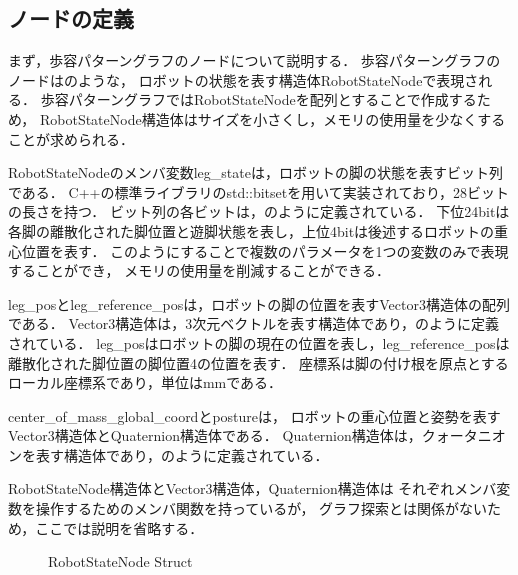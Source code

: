 \subsection{ノードの定義}
まず，歩容パターングラフのノードについて説明する．
歩容パターングラフのノードはのような，
ロボットの状態を表す構造体RobotStateNodeで表現される．
歩容パターングラフではRobotStateNodeを配列とすることで作成するため，
RobotStateNode構造体はサイズを小さくし，メモリの使用量を少なくすることが求められる．

RobotStateNodeのメンバ変数leg\_stateは，ロボットの脚の状態を表すビット列である．
C++の標準ライブラリのstd::bitsetを用いて実装されており，28ビットの長さを持つ．
ビット列の各ビットは，のように定義されている．
下位24bitは各脚の離散化された脚位置と遊脚状態を表し，上位4bitは後述するロボットの重心位置を表す．
このようにすることで複数のパラメータを1つの変数のみで表現することができ，
メモリの使用量を削減することができる．

leg\_posとleg\_reference\_posは，ロボットの脚の位置を表すVector3構造体の配列である．
Vector3構造体は，3次元ベクトルを表す構造体であり，のように定義されている．
leg\_posはロボットの脚の現在の位置を表し，leg\_reference\_posは離散化された脚位置の脚位置4の位置を表す．
座標系は脚の付け根を原点とするローカル座標系であり，単位はmmである．

center\_of\_mass\_global\_coordとpostureは，
ロボットの重心位置と姿勢を表すVector3構造体とQuaternion構造体である．
Quaternion構造体は，クォータニオンを表す構造体であり，のように定義されている．

RobotStateNode構造体とVector3構造体，Quaternion構造体は
それぞれメンバ変数を操作するためのメンバ関数を持っているが，
グラフ探索とは関係がないため，ここでは説明を省略する．

\begin{figure}[htbp]
  \centering
  \caption{RobotStateNode Struct}
  \label{fig:robot_state_node}  %
\end{figure}

